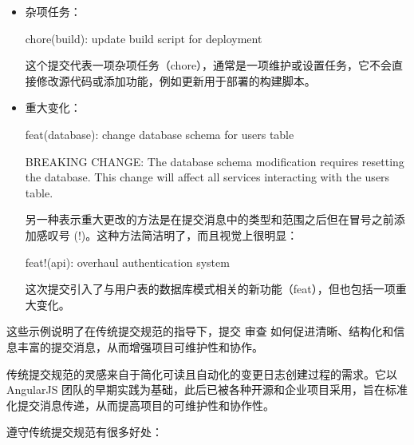 \begin{itemize}
\item
杂项任务：

\begin{shell}
chore(build): update build script for deployment
\end{shell}

这个提交代表一项杂项任务（chore），通常是一项维护或设置任务，它不会直接修改源代码或添加功能，例如更新用于部署的构建脚本。

\item
重大变化：

\begin{shell}
feat(database): change database schema for users table

BREAKING CHANGE: The database schema modification requires resetting the database. This change will affect all services interacting with the users table.
\end{shell}

另一种表示重大更改的方法是在提交消息中的类型和范围之后但在冒号之前添加感叹号 (!)。这种方法简洁明了，而且视觉上很明显：

\begin{shell}
feat!(api): overhaul authentication system
\end{shell}

这次提交引入了与用户表的数据库模式相关的新功能（feat），但也包括一项重大变化。

\end{itemize}

这些示例说明了在传统提交规范的指导下，提交 审查 如何促进清晰、结构化和信息丰富的提交消息，从而增强项目可维护性和协作。


传统提交规范的灵感来自于简化可读且自动化的变更日志创建过程的需求。它以 AngularJS 团队的早期实践为基础，此后已被各种开源和企业项目采用，旨在标准化提交消息传递，从而提高项目的可维护性和协作性。


遵守传统提交规范有很多好处：

